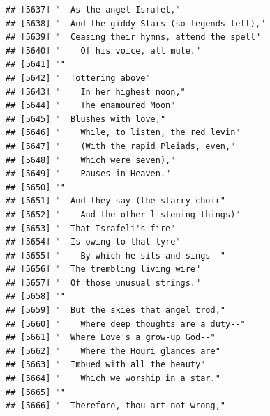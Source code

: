 \documentclass{article}\usepackage[]{graphicx}\usepackage[]{color}
\makeatletter
\newenvironment{kframe}{%
 \def\at@end@of@kframe{}%
 \ifinner\ifhmode%
  \def\at@end@of@kframe{\end{minipage}}%
  \begin{minipage}{\columnwidth}%
 \fi\fi%
 \def\FrameCommand##1{\hskip\@totalleftmargin \hskip-\fboxsep
 \colorbox{shadecolor}{##1}\hskip-\fboxsep
     \hskip-\linewidth \hskip-\@totalleftmargin \hskip\columnwidth}%
 \MakeFramed {\advance\hsize-\width
   \@totalleftmargin\z@ \linewidth\hsize
   \@setminipage}}%
 {\par\unskip\endMakeFramed%
 \at@end@of@kframe}
\newenvironment{knitrout}{}{} %
\makeatother
\begin{document}
\begin{knitrout}
\begin{kframe}
\begin{verbatim}
## [5637] "  As the angel Israfel,"                                                     
## [5638] "  And the giddy Stars (so legends tell),"                                    
## [5639] "  Ceasing their hymns, attend the spell"                                     
## [5640] "    Of his voice, all mute."                                                 
## [5641] ""                                                                            
## [5642] "  Tottering above"                                                           
## [5643] "    In her highest noon,"                                                    
## [5644] "    The enamoured Moon"                                                      
## [5645] "  Blushes with love,"                                                        
## [5646] "    While, to listen, the red levin"                                         
## [5647] "    (With the rapid Pleiads, even,"                                          
## [5648] "    Which were seven),"                                                      
## [5649] "    Pauses in Heaven."                                                       
## [5650] ""                                                                            
## [5651] "  And they say (the starry choir"                                            
## [5652] "    And the other listening things)"                                         
## [5653] "  That Israfeli's fire"                                                      
## [5654] "  Is owing to that lyre"                                                     
## [5655] "    By which he sits and sings--"                                            
## [5656] "  The trembling living wire"                                                 
## [5657] "  Of those unusual strings."                                                 
## [5658] ""                                                                            
## [5659] "  But the skies that angel trod,"                                            
## [5660] "    Where deep thoughts are a duty--"                                        
## [5661] "  Where Love's a grow-up God--"                                              
## [5662] "    Where the Houri glances are"                                             
## [5663] "  Imbued with all the beauty"                                                
## [5664] "    Which we worship in a star."                                             
## [5665] ""                                                                            
## [5666] "  Therefore, thou art not wrong,"                                            

\end{verbatim}
\end{kframe}
\end{knitrout}
\end{document}
